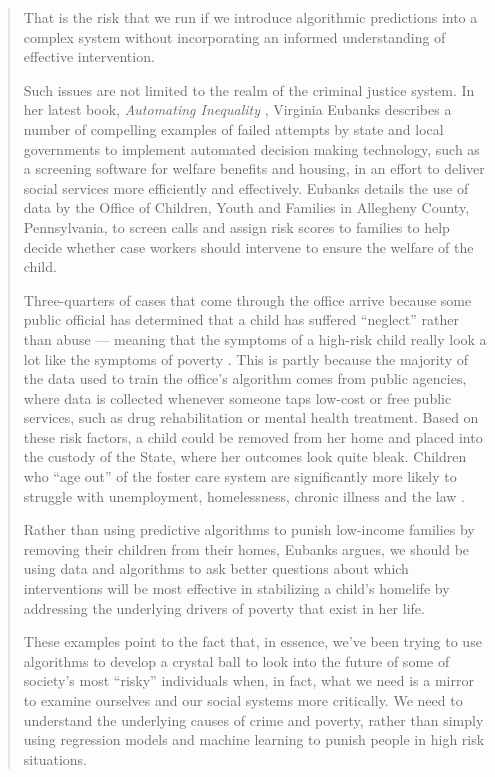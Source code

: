 \begin{quote}
That is the risk that we run if we introduce algorithmic predictions into a complex system without incorporating an informed understanding of effective intervention.
 
Such issues are not limited to the realm of the criminal justice system. In her latest book, \textit{Automating Inequality} \cite{eubanks2018automating}, Virginia Eubanks describes a number of compelling examples of failed attempts by state and local governments to implement automated decision making technology, such as a screening software for welfare benefits and housing, in an effort to deliver social services more efficiently and effectively. Eubanks details the use of data by the Office of Children, Youth and Families in Allegheny County, Pennsylvania, to screen calls and assign risk scores to families to help decide whether case workers should intervene to ensure the welfare of the child.
 
Three-quarters of cases that come through the office arrive because some public official has determined that a child has suffered ``neglect'' rather than abuse --- meaning that the symptoms of a high-risk child really look a lot like the symptoms of poverty \cite{eubanks2018automating}. This is partly because the majority of the data used to train the office's algorithm comes from public agencies, where data is collected whenever someone taps low-cost or free public services, such as drug rehabilitation or mental health treatment. Based on these risk factors, a child could be removed from her home and placed into the custody of the State, where her outcomes look quite bleak. Children who ``age out'' of the foster care system are significantly more likely to struggle with unemployment, homelessness, chronic illness and the law \cite{reilly2003transition, courtney1998foster}.
 
Rather than using predictive algorithms to punish low-income families by removing their children from their homes, Eubanks argues, we should be using data and algorithms to ask better questions about which interventions will be most effective in stabilizing a child's homelife by addressing the underlying drivers of poverty that exist in her life. 
 
These examples point to the fact that, in essence, we've been trying to use algorithms to develop a crystal ball to look into the future of some of society's most ``risky'' individuals when, in fact, what we need is a mirror to examine ourselves and our social systems more critically. We need to understand the underlying causes of crime and poverty, rather than simply using regression models and machine learning to punish people in high risk situations.


\end{quote}
